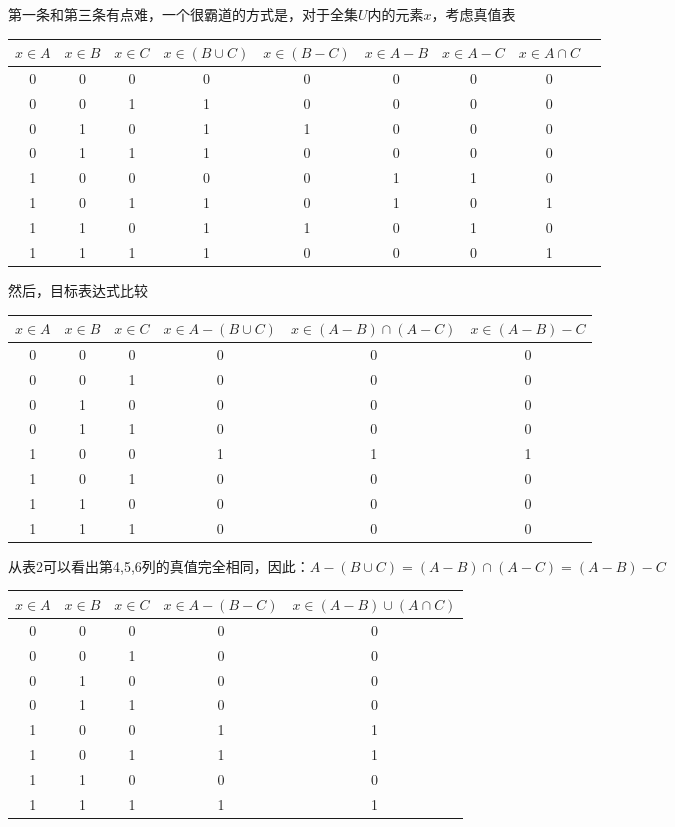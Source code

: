 第一条和第三条有点难，一个很霸道的方式是，对于全集$U$内的元素$x$，考虑真值表
\begin{center}
\begin{tabular}{ccc|cccccc}
$x \in A$ & $x \in B$ & $x \in C$ & $x \in (B \cup C)$ & $x \in (B - C)$ & $x \in A - B$ & $x \in A - C$ & $x \in A \cap C$ \\
\hline
0 & 0 & 0 & 0 & 0 & 0 & 0 & 0 \\
0 & 0 & 1 & 1 & 0 & 0 & 0 & 0 \\
0 & 1 & 0 & 1 & 1 & 0 & 0 & 0 \\
0 & 1 & 1 & 1 & 0 & 0 & 0 & 0 \\
1 & 0 & 0 & 0 & 0 & 1 & 1 & 0 \\
1 & 0 & 1 & 1 & 0 & 1 & 0 & 1 \\
1 & 1 & 0 & 1 & 1 & 0 & 1 & 0 \\
1 & 1 & 1 & 1 & 0 & 0 & 0 & 1 \\
\end{tabular}
\end{center}
然后，目标表达式比较
\begin{center}
\begin{tabular}{ccc|ccc}
$x \in A$ & $x \in B$ & $x \in C$ & $x \in A - (B \cup C)$ & $x \in (A - B) \cap (A - C)$ & $x \in (A - B) - C$ \\
\hline
0 & 0 & 0 & 0 & 0 & 0 \\
0 & 0 & 1 & 0 & 0 & 0 \\
0 & 1 & 0 & 0 & 0 & 0 \\
0 & 1 & 1 & 0 & 0 & 0 \\
1 & 0 & 0 & 1 & 1 & 1 \\
1 & 0 & 1 & 0 & 0 & 0 \\
1 & 1 & 0 & 0 & 0 & 0 \\
1 & 1 & 1 & 0 & 0 & 0 \\
\end{tabular}
\end{center}
从表2可以看出第4,5,6列的真值完全相同，因此：$A - (B \cup C) = (A - B) \cap (A - C) = (A - B) - C$
\begin{center}
\begin{tabular}{ccc|cc}
$x \in A$ & $x \in B$ & $x \in C$ & $x \in A - (B - C)$ & $x \in (A - B) \cup (A \cap C)$ \\
\hline
0 & 0 & 0 & 0 & 0 \\
0 & 0 & 1 & 0 & 0 \\
0 & 1 & 0 & 0 & 0 \\
0 & 1 & 1 & 0 & 0 \\
1 & 0 & 0 & 1 & 1 \\
1 & 0 & 1 & 1 & 1 \\
1 & 1 & 0 & 0 & 0 \\
1 & 1 & 1 & 1 & 1 \\
\end{tabular}
\end{center}
